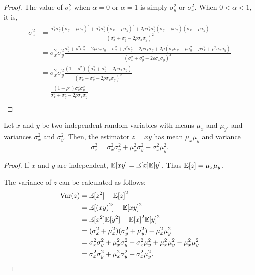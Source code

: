 \begin{proof}
  The value of $\sigma_z^2$ when $\alpha = 0$ or $\alpha=1$ is simply $\sigma_y^2$ or $\sigma_x^2$.
  When $0 < \alpha < 1$, it is,
  \begin{align*}
    \sigma_z^2
            &= \frac{
            \sigma_x^2 \sigma_y^2 (\sigma_y - \rho \sigma_x)^2
            + \sigma_x^2 \sigma_y^2 (\sigma_x - \rho \sigma_y)^2
            + 2 \rho \sigma_x^2 \sigma_y^2 (\sigma_y - \rho \sigma_x) (\sigma_x - \rho \sigma_y)}{
            (\sigma_x^2 + \sigma_y^2 - 2\rho \sigma_x \sigma_y)^2
            }\\
            &= \sigma_x^2 \sigma_y^2 
            \frac{
             \sigma_y^2 + \rho^2 \sigma_x^2 - 2 \rho \sigma_x \sigma_y 
            + \sigma_x^2 + \rho^2 \sigma_y^2 - 2 \rho \sigma_x \sigma_y 
            + 2 \rho (\sigma_x \sigma_y - \rho \sigma_y^2 - \rho \sigma_x^2 + \rho^2 \sigma_x \sigma_y)}{
            (\sigma_x^2 + \sigma_y^2 - 2\rho \sigma_x \sigma_y)^2
            }\\
            &= \sigma_x^2 \sigma_y^2 
            \frac{
             (1 - \rho^2) (\sigma_x^2 + \sigma_y^2 - 2 \rho \sigma_x \sigma_y)}{
            (\sigma_x^2 + \sigma_y^2 - 2\rho \sigma_x \sigma_y)^2
            }\\
            &= 
            \frac{(1 - \rho^2) \sigma_x^2 \sigma_y^2}{
              \sigma_x^2 + \sigma_y^2 - 2\rho \sigma_x \sigma_y
            }\\
  \end{align*}
\end{proof}

\begin{lemma}
  \label{lem:variance-product}
  Let $x$ and $y$ be two independent random variables with means $\mu_x$ and $\mu_y$, and variances $\sigma^2_x$ and $\sigma^2_y$.
  Then, the estimator $z = x y$ has mean $\mu_x \mu_y$ and variance
  $$\sigma^2_z = \sigma_x^2 \sigma_y^2 + \mu_x^2 \sigma_y^2 + \sigma_x^2 \mu_y^2.$$
\end{lemma}
\begin{proof}
  If $x$ and $y$ are independent, $\mathbb{E}[xy] = \mathbb{E}[x]\mathbb{E}[y]$. Thus $\mathbb{E}[z] = \mu_x \mu_y$.

  The variance of $z$ can be calculated as follows:
  \begin{align*}
    \text{Var}(z) &= \mathbb{E}[z^2] - {\mathbb{E}[z]}^2 \\
    &= \mathbb{E}[{(xy)}^2] - {\mathbb{E}[xy]}^2 \\
            &= \mathbb{E}[x^2] \mathbb{E}[y^2] - {\mathbb{E}[x]}^2 {\mathbb{E}[y]}^2 \\
            &= (\sigma^2_x + \mu_x^2)(\sigma^2_y + \mu_y^2) - \mu_x^2 \mu_y^2 \\
            &= \sigma_x^2 \sigma_y^2 + \mu_x^2 \sigma_y^2 + \sigma_x^2 \mu_y^2 + \mu_x^2 \mu_y^2 - \mu_x^2 \mu_y^2 \\
            &= \sigma_x^2 \sigma_y^2 + \mu_x^2 \sigma_y^2 + \sigma_x^2 \mu_y^2.
  \end{align*}
\end{proof}

